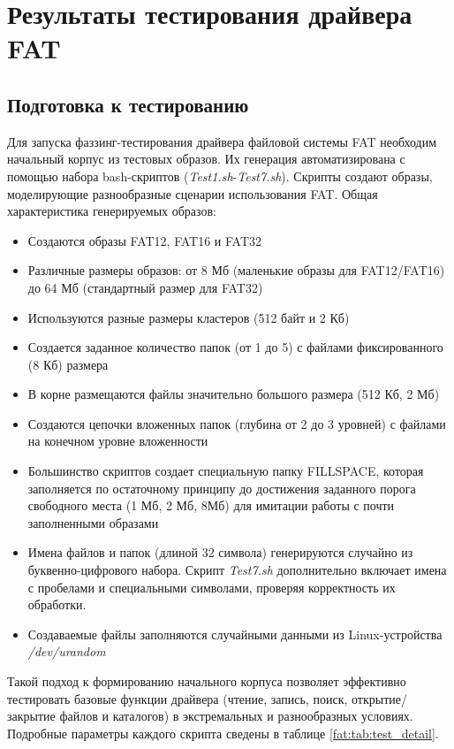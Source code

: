 \section{Результаты тестирования драйвера FAT}

\subsection{Подготовка к тестированию}
Для запуска фаззинг-тестирования драйвера файловой системы FAT необходим начальный корпус из тестовых образов. Их генерация автоматизирована с помощью набора bash-скриптов (\textit{Test1.sh}-\textit{Test7.sh}). Скрипты создают образы, моделирующие разнообразные сценарии использования FAT.  Общая характеристика генерируемых образов:
\begin{itemize}
	\item Создаются образы FAT12, FAT16 и FAT32
	\item Различные размеры образов: от 8 Мб (маленькие образы для FAT12/FAT16) до 64 Мб (стандартный размер для FAT32)
	\item Используются разные размеры кластеров (512 байт и 2 Кб)
	\item Создается заданное количество папок (от 1 до 5) с файлами фиксированного (8 Кб) размера
	\item В корне размещаются файлы значительно большого размера (512 Кб, 2 Мб)
	\item Создаются цепочки вложенных папок (глубина от 2 до 3 уровней) с файлами на конечном уровне вложенности
	\item Большинство скриптов создает специальную папку FILLSPACE, которая заполняется по остаточному принципу до достижения заданного порога свободного места (1 Мб, 2 Мб, 8Мб) для имитации работы с почти заполненными образами
	\item Имена файлов и папок (длиной 32 символа) генерируются случайно из буквенно-цифрового набора. Скрипт \textit{Test7.sh} дополнительно включает имена с пробелами и специальными символами, проверяя корректность их обработки.
	\item Создаваемые файлы заполняются случайными данными из Linux-устройства \textit{/dev/urandom} 
\end{itemize} 
Такой подход к формированию начального корпуса позволяет эффективно тестировать базовые функции драйвера (чтение, запись, поиск, открытие/закрытие файлов и каталогов) в экстремальных и разнообразных условиях. Подробные параметры каждого скрипта сведены в таблице \ref{fat:tab:test_detail}.
